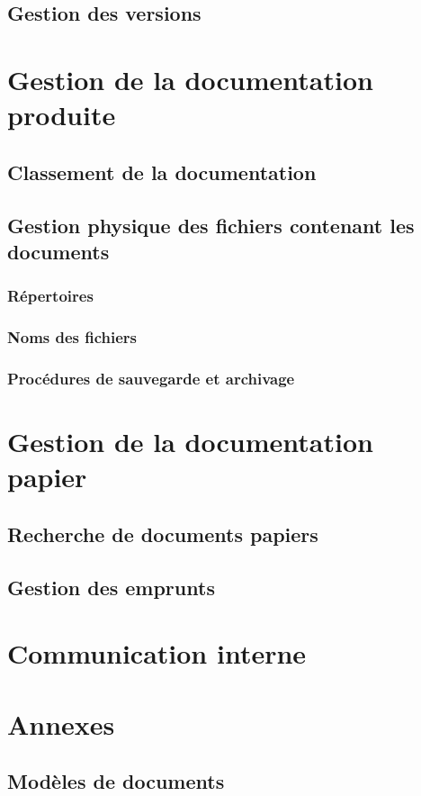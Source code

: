   \subsection{Gestion des versions}
\section{Gestion de la documentation produite}
  \subsection{Classement de la documentation}
  \subsection{Gestion physique des fichiers contenant les documents}     
    \subsubsection{Répertoires}
    \subsubsection{Noms des fichiers}
    \subsubsection{Procédures de sauvegarde et archivage}
\section{Gestion de la documentation papier}
  \subsection{Recherche de documents papiers}
  \subsection{Gestion des emprunts}
\section{Communication interne}
\section{Annexes}
  \subsection{Modèles de documents}
